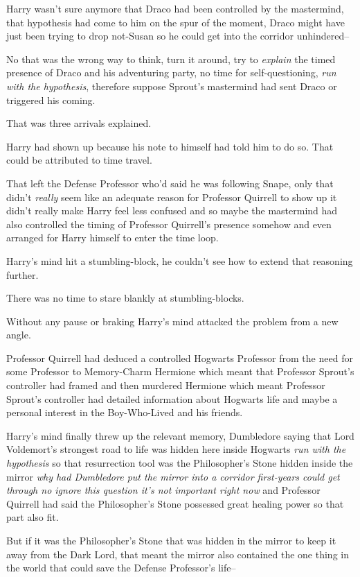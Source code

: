 Harry wasn't sure anymore that Draco had been controlled by the mastermind, that hypothesis had come to him on the spur of the moment, Draco might have just been trying to drop not-Susan so he could get into the corridor unhindered\---

No that was the wrong way to think, turn it around, try to \emph{explain} the timed presence of Draco and his adventuring party, no time for self-questioning, \emph{run with the hypothesis}, therefore suppose Sprout's mastermind had sent Draco or triggered his coming.

That was three arrivals explained.

Harry had shown up because his note to himself had told him to do so. That could be attributed to time travel.

That left the Defense Professor who'd said he was following Snape, only that didn't \emph{really} seem like an adequate reason for Professor Quirrell to show up it didn't really make Harry feel less confused and so maybe the mastermind had also controlled the timing of Professor Quirrell's presence somehow and even arranged for Harry himself to enter the time loop.

Harry's mind hit a stumbling-block, he couldn't see how to extend that reasoning further.

There was no time to stare blankly at stumbling-blocks.

Without any pause or braking Harry's mind attacked the problem from a new angle.

Professor Quirrell had deduced a controlled Hogwarts Professor from the need for some Professor to Memory-Charm Hermione which meant that Professor Sprout's controller had framed and then murdered Hermione which meant Professor Sprout's controller had detailed information about Hogwarts life and maybe a personal interest in the Boy-Who-Lived and his friends.

Harry's mind finally threw up the relevant memory, Dumbledore saying that Lord Voldemort's strongest road to life was hidden here inside Hogwarts \emph{run with the hypothesis} so that resurrection tool was the Philosopher's Stone hidden inside the mirror \emph{why had Dumbledore put the mirror into a corridor first-years could get through no ignore this question it's not important right now} and Professor Quirrell had said the Philosopher's Stone possessed great healing power so that part also fit.

But if it was the Philosopher's Stone that was hidden in the mirror to keep it away from the Dark Lord, that meant the mirror also contained the one thing in the world that could save the Defense Professor's life\---

